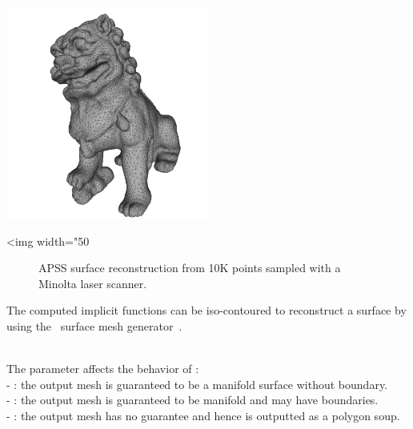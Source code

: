   \\
  \\

\begin{center}
    \label{Surface_reconstruction_points_3-fig-APSS}
    \begin{ccTexOnly}
        \includegraphics[width=0.5\textwidth]{Surface_reconstruction_points_3/APSS} %
    \end{ccTexOnly}
    \begin{ccHtmlOnly}
        <img width="50%
    \end{ccHtmlOnly}
    \begin{figure}[h]
        \caption{APSS surface reconstruction from 10K
                 points sampled with a Minolta laser scanner.}
    \end{figure}
\end{center}

The computed implicit functions can be iso-contoured to reconstruct a surface by using the \cgal\ surface mesh generator~\cite{cgal:ry-gsddrm-06,cgal:bo-pgsms-05}.

  \\

The parameter  affects the behavior of : \\
- : the output mesh is guaranteed to be a manifold surface without boundary.\\
- : the output mesh is guaranteed to be manifold and may have boundaries.\\
- : the output mesh has no guarantee and hence is outputted as a polygon soup.


